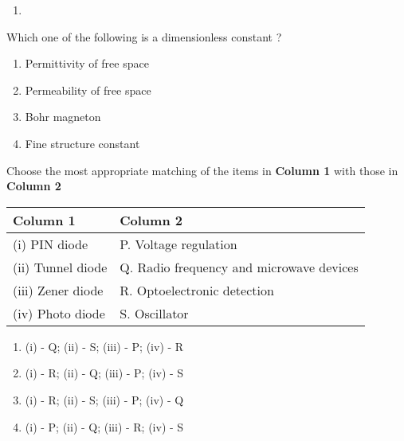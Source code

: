 \begin{multicols}{2}
\begin{enumerate}
    \item
    \begin{center}
    \end{center}

\end{enumerate}
\end{multicols}

\item Which one of the following is a dimensionless constant ?
\begin{enumerate}
    \item Permittivity of free space
    \item Permeability of free space
    \item Bohr magneton
    \item Fine structure constant
\end{enumerate}
\item Choose the most appropriate matching of the items in \textbf{Column 1} with those in
\textbf{Column 2}\\
\begin{table}[h]
    \centering
    \begin{tabular}{|l|l|}
        \hline
        \textbf{Column 1} & \textbf{Column 2} \\
        \hline
        (i) PIN diode &     P. Voltage regulation \\
        (ii) Tunnel diode & Q. Radio frequency and microwave devices \\
        (iii) Zener diode & R. Optoelectronic detection \\
        (iv) Photo diode &  S. Oscillator \\
        \hline
    \end{tabular}
\end{table}
\begin{enumerate}
    \item (i) - Q; (ii) - S; (iii) - P; (iv) - R
    \item (i) - R; (ii) - Q; (iii) - P; (iv) - S
    \item (i) - R; (ii) - S; (iii) - P; (iv) - Q
    \item (i) - P; (ii) - Q; (iii) - R; (iv) - S
\end{enumerate}


